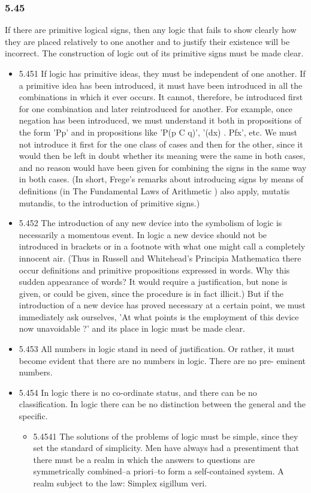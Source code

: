 \documentclass[11pt]{article}
\begin{document}
\subsubsection*{5.45}
\label{sec:orgd90f076}
If there are primitive logical signs, then any logic that fails to
show clearly how they are placed relatively to one another and to justify
their existence will be incorrect. The construction of logic out of its
primitive signs must be made clear.
\begin{itemize}
\item 5.451
\label{sec:orga695f42}
If logic has primitive ideas, they must be independent of one
another. If a primitive idea has been introduced, it must have been
introduced in all the combinations in which it ever occurs. It cannot,
therefore, be introduced first for one combination and later reintroduced
for another. For example, once negation has been introduced, we must
understand it both in propositions of the form 'Pp' and in propositions
like 'P(p C q)', '(dx) . Pfx', etc. We must not introduce it first for the
one class of cases and then for the other, since it would then be left in
doubt whether its meaning were the same in both cases, and no reason would
have been given for combining the signs in the same way in both cases. (In
short, Frege's remarks about introducing signs by means of definitions (in
The Fundamental Laws of Arithmetic ) also apply, mutatis mutandis, to the
introduction of primitive signs.)
\item 5.452
\label{sec:orgf51610b}
The introduction of any new device into the symbolism of logic is
necessarily a momentous event. In logic a new device should not be
introduced in brackets or in a footnote with what one might call a
completely innocent air. (Thus in Russell and Whitehead's Principia
Mathematica there occur definitions and primitive propositions expressed in
words. Why this sudden appearance of words? It would require a
justification, but none is given, or could be given, since the procedure is
in fact illicit.) But if the introduction of a new device has proved
necessary at a certain point, we must immediately ask ourselves, 'At what
points is the employment of this device now unavoidable ?' and its place in
logic must be made clear.
\item 5.453
\label{sec:orgd3ad9d4}
All numbers in logic stand in need of justification. Or rather, it
must become evident that there are no numbers in logic. There are no pre-
eminent numbers.
\item 5.454
\label{sec:orgcbca3b8}
In logic there is no co-ordinate status, and there can be no
classification. In logic there can be no distinction between the general
and the specific.
\begin{itemize}
\item 5.4541
\label{sec:org703ad8b}
The solutions of the problems of logic must be simple, since they
set the standard of simplicity. Men have always had a presentiment that
there must be a realm in which the answers to questions are symmetrically
combined--a priori--to form a self-contained system. A realm subject to the
law: Simplex sigillum veri.
\end{itemize}
\end{itemize}
\end{document}
